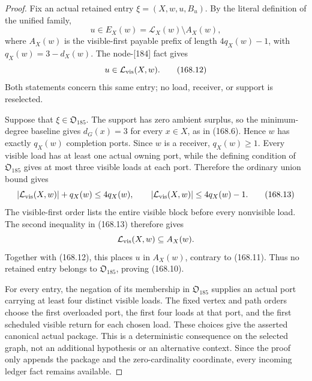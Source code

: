\documentclass[11pt]{article}
\begin{document}
\begin{proof}
Fix an actual retained entry \(\xi=(X,w,u,B_u)\).  By the literal definition
of the unified family,
\[
       u\in E_X(w)=\mathcal L_X(w)\setminus A_X(w),       \tag{168.11}
\]
where \(A_X(w)\) is the visible-first payable prefix of length
\(4q_X(w)-1\), with \(q_X(w)=3-d_X(w)\).  The node-\textup{[184]} fact gives
\[
                    u\in\mathcal L_{\rm vis}(X,w).        \tag{168.12}
\]
Both statements concern this same entry; no load, receiver, or support is
reselected.

Suppose that \(\xi\in\mathfrak O_{185}\).  The support has zero ambient
surplus, so the minimum-degree baseline gives \(d_G(x)=3\) for every
\(x\in X\), as in \textup{(168.6)}.  Hence \(w\) has exactly \(q_X(w)\)
completion ports.  Since \(w\) is a receiver, \(q_X(w)\ge1\).  Every visible
load has at least one actual owning port, while the defining condition of
\(\mathfrak O_{185}\) gives at most three visible loads at each port.
Therefore the ordinary union bound gives
\[
 |\mathcal L_{\rm vis}(X,w)|+q_X(w)\le4q_X(w),
 \qquad
 |\mathcal L_{\rm vis}(X,w)|\le4q_X(w)-1.                \tag{168.13}
\]
The visible-first order lists the entire visible block before every
nonvisible load.  The second inequality in \textup{(168.13)} therefore gives
\[
                 \mathcal L_{\rm vis}(X,w)\subseteq A_X(w).
\]
Together with \textup{(168.12)}, this places \(u\) in \(A_X(w)\), contrary
to \textup{(168.11)}.  Thus no retained entry belongs to
\(\mathfrak O_{185}\), proving \textup{(168.10)}.

For every entry, the negation of its membership in
\(\mathfrak O_{185}\) supplies an actual port carrying at least four distinct
visible loads.  The fixed vertex and path orders choose the first overloaded
port, the first four loads at that port, and the first scheduled visible
return for each chosen load.  These choices give the asserted canonical
actual package.  This is a deterministic consequence on the selected graph,
not an additional hypothesis or an alternative context.  Since the proof
only appends the package and the zero-cardinality coordinate, every incoming
ledger fact remains available.
\end{proof}
\end{document}
